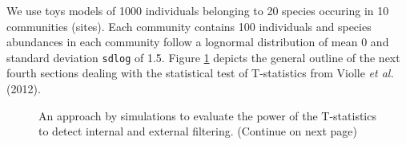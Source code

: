 \documentclass[12pt]{article}\usepackage[]{graphicx}\usepackage[]{color}
\begin{document}
We use toys models of 1000 individuals belonging to 20 species occuring in 10 communities (sites). Each community contains 100 individuals and species abundances in each community follow a lognormal distribution of mean 0 and standard deviation \texttt{sdlog} of 1.5.
Figure \ref{fig:General_outline} depicts the general outline of the next fourth sections dealing with the statistical test of T-statistics from Violle \textit{et al.} (2012).

\begin{figure}[ht]
\centering
\hspace*{-0.8cm}
\vspace*{0.8cm}
\caption[General outline of the simulation concerning the Tstatistics]{An approach by simulations to evaluate the power of the T-statistics to detect internal and external filtering. (Continue on next page) }
\label{fig:General_outline}
\end{figure}
\end{document}
